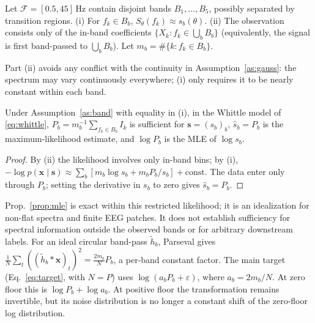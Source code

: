 \begin{assumption}\label{as:band}
Let $\mathcal{F}=[0.5,45]$\,Hz contain disjoint bands $B_1,\dots,B_5$, possibly separated by
transition regions. (i) For $f_k\in B_b$, $S_\theta(f_k)\approx s_b(\theta)$. (ii) The
observation consists only of the in-band coefficients $\{X_k:f_k\in\bigcup_bB_b\}$
(equivalently, the signal is first band-passed to $\bigcup_bB_b$). Let
$m_b=\#\{k:f_k\in B_b\}$.
\end{assumption}
\noindent Part (ii) avoids any conflict with the continuity in Assumption~\ref{as:gauss}: the
spectrum may vary continuously everywhere; (i) only requires it to be nearly constant within
each band.

\begin{proposition}\label{prop:mle}
Under Assumption~\ref{as:band} with equality in (i), in the Whittle model of \eqref{eq:whittle},
$P_b=m_b^{-1}\sum_{f_k\in B_b}I_k$ is sufficient for $\bm{s}=(s_b)_b$, $\hat s_b=P_b$ is the
maximum-likelihood estimate, and $\log P_b$ is the MLE of $\log s_b$.
\end{proposition}
\begin{proof}
By (ii) the likelihood involves only in-band bins; by (i),
$-\log p(\bm{x}\mid\bm{s})\approx\sum_b[m_b\log s_b+m_bP_b/s_b]+\text{const}$. The data enter
only through $P_b$; setting the derivative in $s_b$ to zero gives $\hat s_b=P_b$.
\end{proof}
\begin{remark}
Prop.~\ref{prop:mle} is exact within this restricted likelihood; it is an idealization for
non-flat spectra and finite EEG patches. It does not establish sufficiency for spectral
information outside the observed bands or for arbitrary downstream labels. For an
ideal circular band-pass $\tilde h_b$, Parseval gives
$\frac1N\sum_t((\tilde h_b*\bm{x})_t)^2=\frac{2m_b}{N}P_b$, a per-band constant factor. The
main target (Eq.~\eqref{eq:target}, with $N{=}P$) uses
$\log(a_bP_b+\varepsilon)$, where $a_b=2m_b/N$. At zero floor this is $\log P_b+\log a_b$.
At positive floor the transformation remains invertible, but its noise distribution is no
longer a constant shift of the zero-floor log distribution.
\end{remark}

